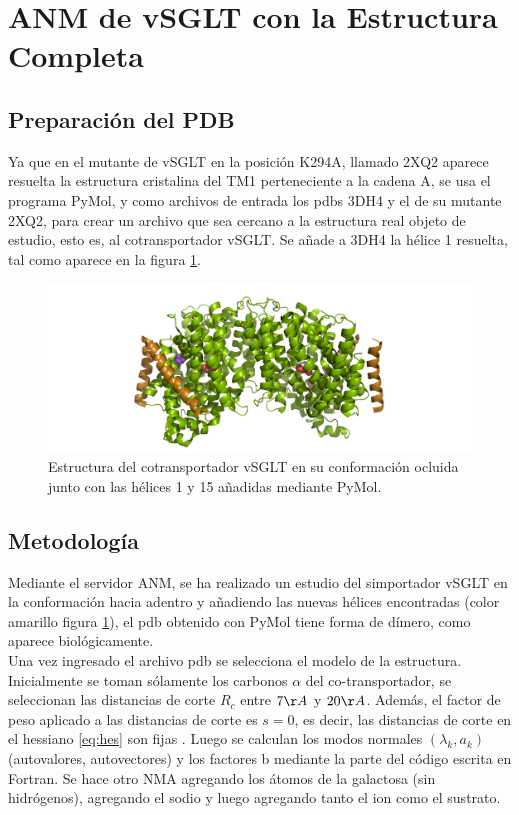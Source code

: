 \section{ANM de vSGLT con la Estructura Completa}
\subsection{Preparaci\'{o}n del PDB}
Ya que en el mutante de vSGLT en la posici\'{o}n K294A, llamado 2XQ2 aparece resuelta la estructura cristalina del TM1 perteneciente a la cadena A, se usa el programa PyMol, y como archivos de entrada los pdbs 3DH4 y el de su mutante 2XQ2, para crear un archivo que sea cercano a la estructura real objeto de estudio, esto es, al cotransportador vSGLT. Se a\~{n}ade a 3DH4 la h\'{e}lice 1 resuelta, tal como aparece en la figura \ref{fig:vSGLT_in_2}.\\
\begin{figure}[h]
 \centering
 \includegraphics[scale=0.3]{Kap4/vSGLT_n.png}
 \caption{Estructura del cotransportador vSGLT en su conformaci\'{o}n ocluida junto con las h\'{e}lices 1 y 15 a\~{n}adidas mediante PyMol.}
 \label{fig:vSGLT_in_2}
\end{figure}
\subsection{Metodolog\'{i}a}
Mediante el servidor ANM, se ha realizado un estudio del simportador vSGLT en la conformaci\'{o}n hacia adentro y a\~{n}adiendo las nuevas h\'{e}lices encontradas (color amarillo figura \ref{fig:vSGLT_in_2}), el pdb obtenido con PyMol tiene forma de d\'{i}mero, como aparece biol\'{o}gicamente. \\

Una vez ingresado el archivo pdb se selecciona el modelo de la estructura. Inicialmente se toman s\'{o}lamente los carbonos $\alpha$ del co-transportador, se seleccionan las distancias de corte $R_c$ entre $7\AA$ y $20\AA$. Adem\'{a}s, el factor de peso aplicado a las distancias de corte es $s=0$, es decir, las distancias de corte en el hessiano \eqref{eq:hes} son fijas \cite{Zimmermann2011}. Luego se calculan los modos normales $(\lambda_k,a_k)$ (autovalores, autovectores) y los factores b mediante la parte del c\'{o}digo escrita en Fortran. Se hace otro NMA agregando los \'{a}tomos de la galactosa (sin hidr\'{o}genos), agregando el sodio y luego agregando tanto el ion como el sustrato.\\

